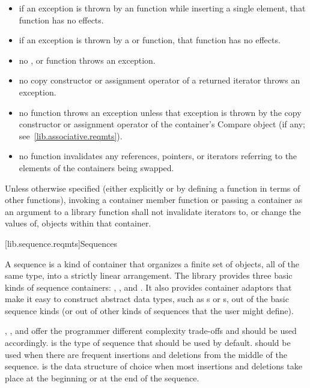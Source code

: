 \begin{itemize}
\item
if an exception is thrown by an
function while inserting a single element, that
function has no effects.
\item
if an exception is thrown by a
or
function, that function has no effects.
\item
no
,
or
function throws an exception.
\item
no copy constructor or assignment operator of a returned iterator
throws an exception.
\item
no
function throws an exception unless that exception is thrown by the copy
constructor or assignment operator of the container's Compare object
(if any; see~\ref{lib.associative.reqmts}).
\item
no
function invalidates any references,
pointers, or iterators referring to the elements
of the containers being swapped.
\end{itemize}

\pnum
Unless otherwise specified (either explicitly or by defining a
function in terms of other functions), invoking a container member
function or passing a container as an argument to a library function
shall not invalidate iterators to, or change the values of, objects
within that container.

[lib.sequence.reqmts]{Sequences}

\pnum
A sequence is a kind of container that organizes a finite set of objects, all of the same type, into a strictly
linear arrangement. The library provides three basic kinds of sequence containers:
, , and . It also provides container adaptors that
make it easy to construct abstract data types, such as s or s, out of
the basic sequence kinds (or out of other kinds of sequences that the user
might define).

\pnum
{}, , and 
offer the programmer different complexity trade-offs and should be used
accordingly.
is the type of sequence that should be used by default.
should be used when there are frequent insertions and deletions from the
middle of the sequence.
is the data structure of choice
when most insertions and deletions take place at the beginning or at the
end of the sequence.

